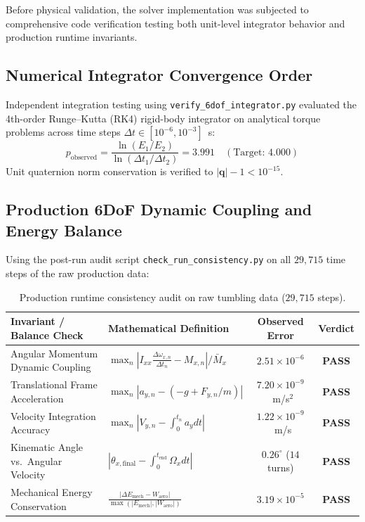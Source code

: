 \documentclass[11pt,a4paper]{article}
\begin{document}
Before physical validation, the solver implementation was subjected to comprehensive code verification testing both unit-level integrator behavior and production runtime invariants.

\subsection{Numerical Integrator Convergence Order}
Independent integration testing using \texttt{verify\_6dof\_integrator.py} evaluated the 4th-order Runge--Kutta (RK4) rigid-body integrator on analytical torque problems across time steps $\Delta t \in [10^{-6}, 10^{-3}]$~s:
\begin{equation}
p_{\mathrm{observed}} = \frac{\ln(E_1 / E_2)}{\ln(\Delta t_1 / \Delta t_2)} = 3.991 \quad (\text{Target: } 4.000)
\end{equation}
Unit quaternion norm conservation is verified to $|\mathbf{q}| - 1 < 10^{-15}$.

\subsection{Production 6DoF Dynamic Coupling and Energy Balance}
Using the post-run audit script \texttt{check\_run\_consistency.py} on all $29,715$ time steps of the raw production data:
\begin{table}[H]
\centering
\small
\begin{tabularx}{\textwidth}{l X c c}
\toprule
\textbf{Invariant / Balance Check} & \textbf{Mathematical Definition} & \textbf{Observed Error} & \textbf{Verdict} \\
\midrule
Angular Momentum Dynamic Coupling & $\max_n \left| I_{xx} \frac{\Delta\omega_{x,n}}{\Delta t_n} - M_{x,n} \right| / \bar{M}_x$ & $2.51 \times 10^{-6}$ & \textbf{PASS} \\
Translational Frame Acceleration & $\max_n \left| a_{y,n} - (-g + F_{y,n}/m) \right|$ & $7.20 \times 10^{-9}$~m/s$^2$ & \textbf{PASS} \\
Velocity Integration Accuracy & $\max_n \left| V_{y,n} - \int_0^{t_n} a_y dt \right|$ & $1.22 \times 10^{-9}$~m/s & \textbf{PASS} \\
Kinematic Angle vs.\ Angular Velocity & $\left| \theta_{x,\mathrm{final}} - \int_0^{t_{\mathrm{end}}} \Omega_x dt \right|$ & $0.26^\circ$ ($14$ turns) & \textbf{PASS} \\
Mechanical Energy Conservation & $\frac{\left| \Delta E_{\mathrm{mech}} - W_{\mathrm{aero}} \right|}{\max(|E_{\mathrm{mech}}|, |W_{\mathrm{aero}}|)}$ & $3.19 \times 10^{-5}$ & \textbf{PASS} \\
\bottomrule
\end{tabularx}
\caption{Production runtime consistency audit on raw tumbling data ($29,715$ steps).}
\label{tab:consistency_audit}
\end{table}
\end{document}
